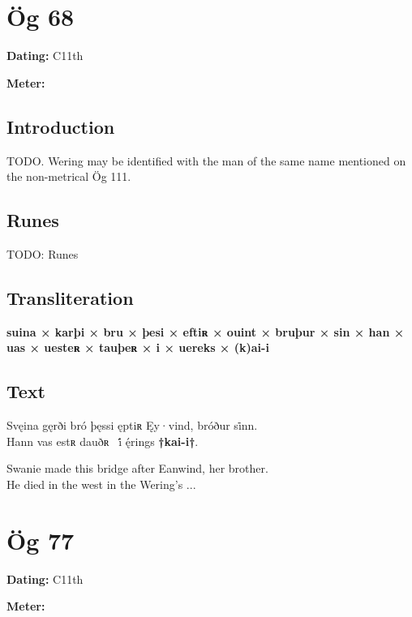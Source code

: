 \sectionline\clearpage


\section{Ög 68}

\begin{flushright}%
\textbf{Dating:} C11th

\textbf{Meter:} \Fornyrdislag
\end{flushright}%

\subsection{Introduction}

TODO.  Wering may be identified with the man of the same name mentioned on the non-metrical Ög 111.

\subsection{Runes}

TODO: Runes%

\subsection{Transliteration}

\textbf{suina × karþi × bru × þesi × eftiʀ × ouint × bruþur × sin × han × uas × uesteʀ × tauþeʀ × i × uereks × (k)ai-i}

\subsection{Text}

\bpg\bpa[0]%
\startsub Svęina gęrði bró þęssi ęptiʀ Ęy·vind, bróður si̇nn.\endsub \\
Hann vas estʀ dauðʀ \hld\ i̇́ ę́rings \textbf{†kai-i†}.\epa

\bpb Swanie made this bridge after Eanwind, her brother. \\
He died in the west in the Wering’s ...\epb\epg

\sectionline\clearpage


\section{Ög 77}

\begin{flushright}%
\textbf{Dating:} C11th

\textbf{Meter:} \Fornyrdislag
\end{flushright}%

